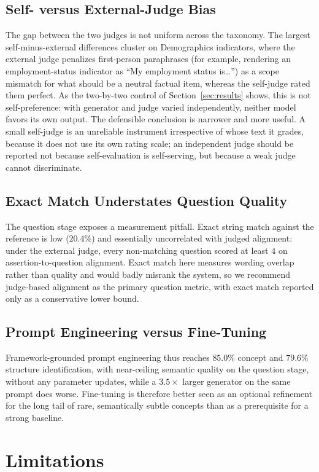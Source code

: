 \documentclass[onecolumn, 11pt]{IEEEtran}
\begin{document}
\subsection{Self- versus External-Judge Bias}
The gap between the two judges is not uniform across the taxonomy. The largest self-minus-external differences cluster on Demographics indicators, where the external judge penalizes first-person paraphrases (for example, rendering an employment-status indicator as ``My employment status is\ldots'') as a scope mismatch for what should be a neutral factual item, whereas the self-judge rated them perfect. As the two-by-two control of Section~\ref{sec:results} shows, this is not self-preference: with generator and judge varied independently, neither model favors its own output. The defensible conclusion is narrower and more useful. A small self-judge is an unreliable instrument irrespective of whose text it grades, because it does not use its own rating scale; an independent judge should be reported not because self-evaluation is self-serving, but because a weak judge cannot discriminate.

\subsection{Exact Match Understates Question Quality}
The question stage exposes a measurement pitfall. Exact string match against the reference is low ($20.4\%$) and essentially uncorrelated with judged alignment: under the external judge, every non-matching question scored at least $4$ on assertion-to-question alignment. Exact match here measures wording overlap rather than quality and would badly misrank the system, so we recommend judge-based alignment as the primary question metric, with exact match reported only as a conservative lower bound.

\subsection{Prompt Engineering versus Fine-Tuning}
Framework-grounded prompt engineering thus reaches $85.0\%$ concept and $79.6\%$ structure identification, with near-ceiling semantic quality on the question stage, without any parameter updates, while a $3.5\times$ larger generator on the same prompt does worse. Fine-tuning is therefore better seen as an optional refinement for the long tail of rare, semantically subtle concepts than as a prerequisite for a strong baseline.

\section{Limitations}
\label{sec:limitations}
\end{document}
